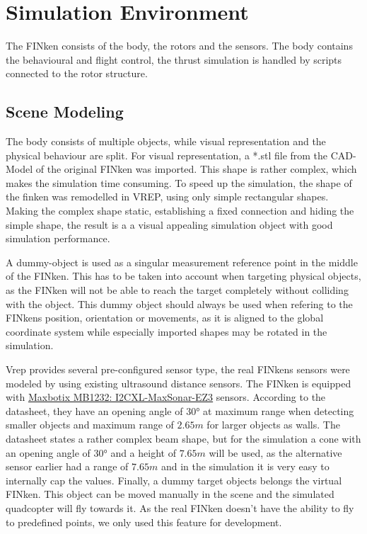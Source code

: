 \label{chap:implementation}

\section{Simulation Environment}

The FINken consists of the body, the rotors and the sensors. The body contains the behavioural and flight control, the thrust simulation is handled by scripts connected to the rotor structure.

\subsection{Scene Modeling}
\label{sec:sceneMod}

The body consists of multiple objects, while visual representation and the physical behaviour are split. 
For visual representation, a *.stl file from the CAD-Model of the original FINken was imported. 
This shape is rather complex, which makes the simulation time consuming. 
To speed up the simulation, the shape of the finken was remodelled in VREP, using only simple rectangular shapes. 
Making the complex shape static, establishing a fixed connection and hiding the simple shape, the result is a a visual appealing simulation object with good simulation performance. 

A dummy-object is used as a singular measurement reference point in the middle of the FINken. 
This has to be taken into account when targeting physical objects, as the FINken will not be able to reach the target completely without colliding with the object. 
This dummy object should always be used when refering to the FINkens position, orientation or movements, as it is aligned to the global coordinate system while especially imported shapes may be rotated in the simulation. 

Vrep provides several pre-configured sensor type, the real FINkens sensors were modeled by using existing ultrasound distance sensors. 
The FINken is equipped with \href{http://www.maxbotix.com/documents/I2CXL-MaxSonar-EZ_Datasheet.pdf}{Maxbotix MB1232: I2CXL-MaxSonar-EZ3} sensors. 
According to the datasheet, they have an opening angle of $\ang{30}$ at maximum range when detecting smaller objects and maximum range of $2.65m$ for larger objects as walls. 
The datasheet states a rather complex beam shape, but for the simulation a cone with an opening angle of $\ang{30}$  and a height of $7.65m$ will be used, as the alternative sensor earlier had a range of $7.65m$ and in the simulation it is very easy to internally cap the values. 
Finally, a dummy target objects belongs the virtual FINken. 
This object can be moved manually in the scene and the simulated quadcopter will fly towards it.  
As the real FINken doesn't have the ability to fly to predefined points, we only used this feature for development.

